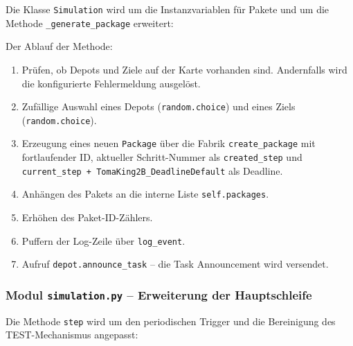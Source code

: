 Die Klasse \texttt{Simulation} wird um die Instanzvariablen für Pakete und um die Methode \texttt{\_generate\_package} erweitert:



Der Ablauf der Methode:
\begin{enumerate}
    \item Prüfen, ob Depots und Ziele auf der Karte vorhanden sind. Andernfalls wird die konfigurierte Fehlermeldung ausgelöst.
    \item Zufällige Auswahl eines Depots (\texttt{random.choice}) und eines Ziels (\texttt{random.choice}).
    \item Erzeugung eines neuen \texttt{Package} über die Fabrik \texttt{create\_package} mit fortlaufender ID, aktueller Schritt-Nummer als \texttt{created\_step} und \texttt{current\_step + TomaKing2B\_DeadlineDefault} als Deadline.
    \item Anhängen des Pakets an die interne Liste \texttt{self.packages}.
    \item Erhöhen des Paket-ID-Zählers.
    \item Puffern der Log-Zeile über \texttt{log\_event}.
    \item Aufruf \texttt{depot.announce\_task} -- die Task Announcement wird versendet.
\end{enumerate}


\subsubsection{Modul \texttt{simulation.py} – Erweiterung der Hauptschleife}

Die Methode \texttt{step} wird um den periodischen Trigger und die Bereinigung des TEST-Mechanismus angepasst:





